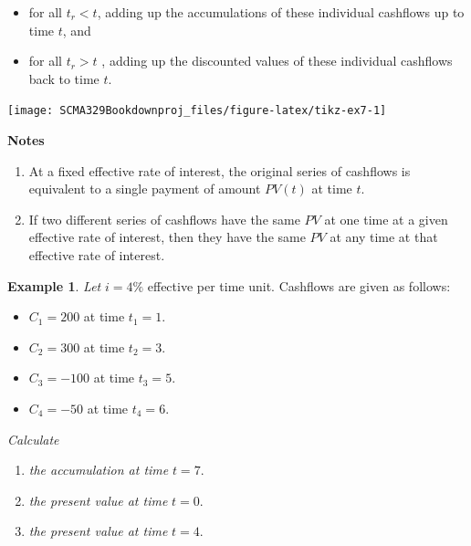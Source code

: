 \documentclass[
]{book}
\theoremstyle{definition}
\theoremstyle{definition}
\newtheorem{example}{Example}[chapter]
\theoremstyle{definition}
\theoremstyle{definition}
\theoremstyle{remark}
\begin{document}
\begin{itemize}
\item
  for all \(t_r < t\), adding up the accumulations of these individual
  cashflows up to time \(t\), and
\item
  for all \(t_r > t\) , adding up the discounted values of these
  individual cashflows back to time \(t\).
\end{itemize}

\begin{center}\texttt{[image: SCMA329Bookdownproj\_files/figure-latex/tikz-ex7-1]} \end{center}

\textbf{Notes}

\begin{enumerate}
\def\labelenumi{\arabic{enumi}.}
\item
  At a fixed effective rate of interest, the original series of
  cashflows is equivalent to a single payment of amount \(PV(t)\) at
  time \(t\).
\item
  If two different series of cashflows have the same \(PV\) at one time
  at a given effective rate of interest, then they have the same \(PV\)
  at any time at that effective rate of interest.
\end{enumerate}

\begin{example}

\emph{Let} \(i = 4\%\) effective per time unit. Cashflows are given as follows:

\begin{itemize}
\item
  \(C_1 = 200\) at time \(t_1 = 1\).
\item
  \(C_2 = 300\) at time \(t_2 = 3\).
\item
  \(C_3 = -100\) at time \(t_3 = 5\).
\item
  \(C_4 = -50\) at time \(t_4 = 6\).
\end{itemize}

\emph{Calculate}

\begin{enumerate}
\def\labelenumi{\arabic{enumi}.}
\item
  \emph{the accumulation at time} \(t = 7\).
\item
  \emph{the present value at time} \(t = 0\).
\item
  \emph{the present value at time} \(t = 4\).
\end{enumerate}

\end{example}
\end{document}
